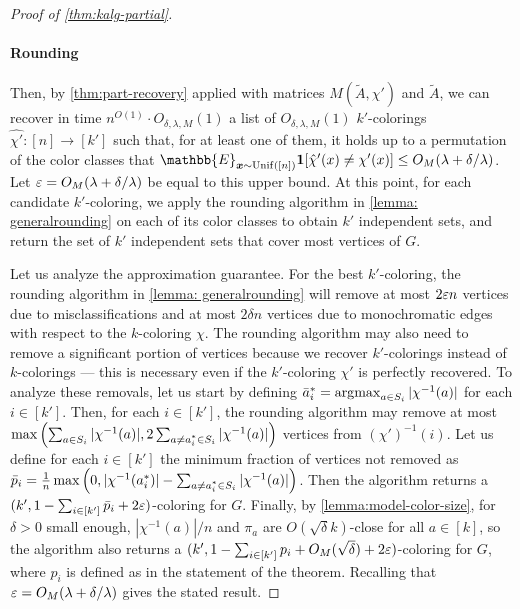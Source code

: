 \begin{proof}[Proof of \cref{thm:kalg-partial}]
    \paragraph{Rounding}
    Then, by \cref{thm:part-recovery} applied with matrices $M(\tilde{A}, \chi')$ and $\tilde{A}$, we can recover in time $n^{O(1)} \cdot O_{\delta,\lambda,M}(1)$ a list of $O_{\delta,\lambda,M}(1)$ $k'$-colorings $\hat{\chi'}: [n] \to [k']$ such that, for at least one of them, it holds up to a permutation of the color classes that $\mathbb{E}_{\bm{x} \sim \operatorname{Unif}([n])} \1[\hat\chi'(x) \neq \chi'(x)] \leq O_M(\lambda+\delta/\lambda)$.
    Let $\varepsilon = O_M(\lambda + \delta/\lambda)$ be equal to this upper bound.
    At this point, for each candidate $k'$-coloring, we apply the rounding algorithm in \cref{lemma: generalrounding} on each of its color classes to obtain $k'$ independent sets, and return the set of $k'$ independent sets that cover most vertices of $G$.

    Let us analyze the approximation guarantee.
    For the best $k'$-coloring, the rounding algorithm in \cref{lemma: generalrounding} will remove at most $2\varepsilon n$ vertices due to misclassifications and at most $2\delta n$ vertices due to monochromatic edges with respect to the $k$-coloring $\chi$.
    The rounding algorithm may also need to remove a significant portion of vertices because we recover $k'$-colorings instead of $k$-colorings --- this is necessary even if the $k'$-coloring $\chi'$ is perfectly recovered.
    To analyze these removals, let us start by defining $\bar{a}_i^* = \operatorname*{\arg\!\max}_{a \in S_i} |\chi^{-1}(a)|$ for each $i \in [k']$.
    Then, for each $i \in [k']$, the rounding algorithm may remove at most $\max\left(\sum_{a \in S_i} |\chi^{-1}(a)|, 2\sum_{\substack{a \neq a_i^{*} \in S_i}} |\chi^{-1}(a)|\right)$ vertices from $(\chi')^{-1}(i)$.
    Let us define for each $i \in [k']$ the minimum fraction of vertices not removed as $\bar{p}_i = \frac{1}{n} \max\left(0, |\chi^{-1}(a_i^*)| - \sum_{\substack{a \neq a_i^{*} \in S_i}} |\chi^{-1}(a)|\right)$.
    Then the algorithm returns a $(k', 1 - \sum_{i \in [k']} \bar{p}_i + 2\varepsilon)$-coloring for $G$.
    Finally, by \cref{lemma:model-color-size}, for $\delta > 0$ small enough, $|\chi^{-1}(a)|/n$ and $\pi_a$ are $O(\sqrt{\delta}k)$-close for all $a \in [k]$, so the algorithm also returns a $(k', 1 - \sum_{i \in [k']} p_i + O_M(\sqrt{\delta}) + 2\varepsilon)$-coloring for $G$, where $p_i$ is defined as in the statement of the theorem.
    Recalling that $\varepsilon = O_M(\lambda + \delta/\lambda)$ gives the stated result.
\end{proof}

